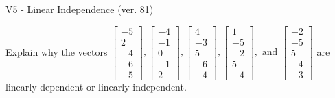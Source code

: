 \begin{exercise}
  \begin{exerciseTitle}V5 - Linear Independence (ver. 81)\end{exerciseTitle}
  \begin{exerciseStatement}
    Explain why the vectors \(\left[\begin{array}{r}
-5 \\
2 \\
-4 \\
-6 \\
-5
\end{array}\right] , \left[\begin{array}{r}
-4 \\
-1 \\
0 \\
-1 \\
2
\end{array}\right] , \left[\begin{array}{r}
4 \\
-3 \\
5 \\
-6 \\
-4
\end{array}\right] , \left[\begin{array}{r}
1 \\
-5 \\
-2 \\
5 \\
-4
\end{array}\right] , \text{ and } \left[\begin{array}{r}
-2 \\
-5 \\
5 \\
-4 \\
-3
\end{array}\right]\) are linearly dependent or linearly independent.	



\end{exerciseStatement}
\end{exercise}
